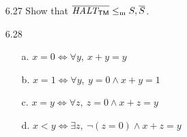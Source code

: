 \begin{itemize}
	\item[6.27]
	Show that $\overline{\textit{HALT}_{\textsf{TM}}} \leq_{\textrm{m}} S, \overline{S}$.
	
	\item[6.28]
	\begin{enumerate}
		\item[a.] $x = 0 \iff \forall y,\ x+y=y$
		\item[b.] $x = 1 \iff \forall y,\ y=0 \wedge x+y=1$ 
		\item[c.] $x = y \iff \forall z,\ z=0 \wedge x+z=y$
		\item[d.] $x < y \iff \exists z,\ \neg(z = 0) \wedge x + z = y$
	\end{enumerate}
	
\end{itemize}